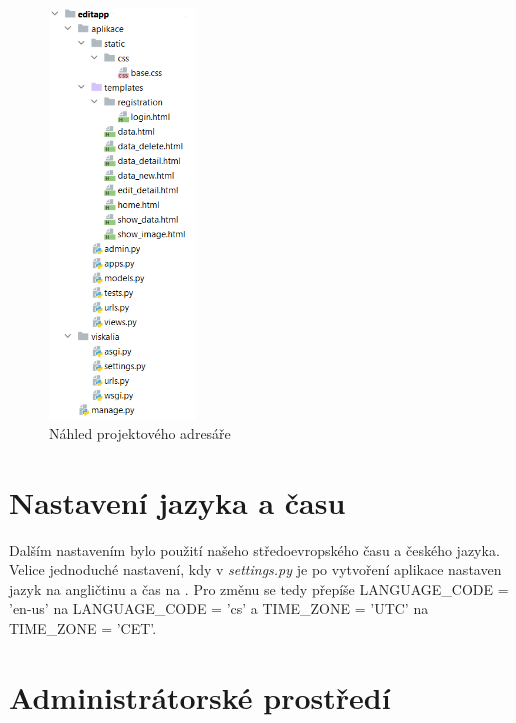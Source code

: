 \begin{figure}[H] \centering
    \includegraphics[width=110pt]{./pictures/7-nahled-adresare.PNG}
    \caption[Náhled projektového adresáře]{Náhled projektového adresáře}
	\label{fig:Náhled projektového adresáře}              
\end{figure}

\section{Nastavení jazyka a času}

Dalším nastavením bylo použití našeho středoevropského času a českého
jazyka. Velice jednoduché nastavení, kdy v \emph{settings.py} je po
vytvoření aplikace nastaven jazyk na angličtinu a čas na . Pro
změnu se tedy přepíše LANGUAGE\_CODE = 'en-us' na
LANGUAGE\_CODE = 'cs' a TIME\_ZONE = 'UTC' na
TIME\_ZONE = 'CET'.

\newpage

\section{Administrátorské prostředí}

